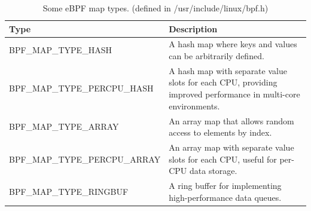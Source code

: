 \begin{table}[htbp]
    \centering
    \begin{tabular}{L{7cm}L{7cm}}
        \toprule
            Type & Description \\
        \midrule
            BPF\_MAP\_TYPE\_HASH & A hash map where keys and values can be arbitrarily defined. \\
        \midrule
            BPF\_MAP\_TYPE\_PERCPU\_HASH & A hash map with separate value slots for each CPU, providing improved performance in multi-core environments. \\
        \midrule
            BPF\_MAP\_TYPE\_ARRAY & An array map that allows random access to elements by index. \\
        \midrule
            BPF\_MAP\_TYPE\_PERCPU\_ARRAY & An array map with separate value slots for each CPU, useful for per-CPU data storage. \\
        \midrule
            BPF\_MAP\_TYPE\_RINGBUF & A ring buffer for implementing high-performance data queues. \\
        \bottomrule
    \end{tabular}
    \caption[Subset of eBPF map types]{Some eBPF map types. (defined in /usr/include/linux/bpf.h)}\label{tab:ebpf-map-types}
\end{table}

\FloatBarrier

